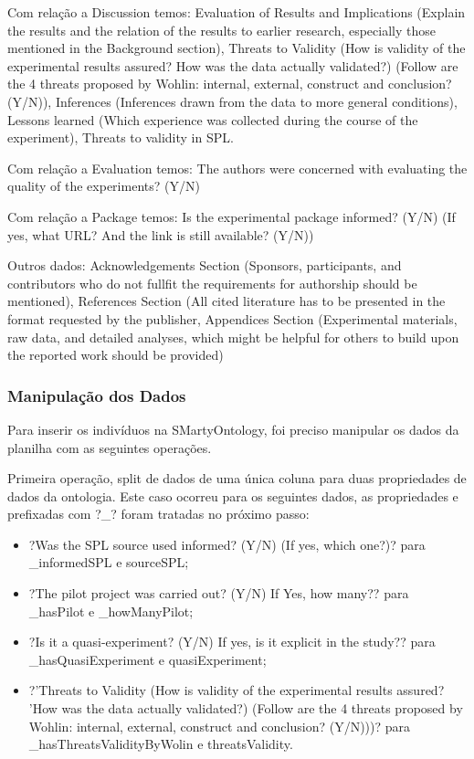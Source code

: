 Com relação a Discussion temos: Evaluation of Results and Implications (Explain the results and the relation of the results to earlier research, especially those mentioned in the Background section), Threats to Validity (How is validity of the experimental results assured? How was the data actually validated?) (Follow are the 4 threats proposed by Wohlin: internal, external, construct and conclusion? (Y/N)), Inferences (Inferences drawn from the data to more general conditions), Lessons learned (Which experience was collected during the course of the experiment), Threats to validity in SPL.

Com relação a Evaluation temos: The authors were concerned with evaluating the quality of the experiments? (Y/N)

Com relação a Package temos: Is the experimental package informed? (Y/N) (If yes, what URL? And the link is still available? (Y/N))

Outros dados: Acknowledgements Section (Sponsors, participants, and contributors who do not fullfit the requirements for authorship should be mentioned), References Section (All cited literature has to be presented in the format requested by the publisher, Appendices Section (Experimental materials, raw data, and detailed analyses, which might be helpful for others to build upon the reported work should be provided)

\subsubsection{Manipulação dos Dados}

Para inserir os indivíduos na SMartyOntology, foi preciso manipular os dados da planilha com as seguintes operações.

Primeira operação, split de dados de uma única coluna para duas propriedades de dados da ontologia. Este caso ocorreu para os seguintes dados, as propriedades e prefixadas com ?\_? foram tratadas no próximo passo:

\begin{itemize}
	\item ?Was the SPL source used informed? (Y/N) (If yes, which one?)? para \_informedSPL e sourceSPL;
	\item ?The pilot project was carried out? (Y/N) If Yes, how many?? para \_hasPilot e \_howManyPilot;
	\item ?Is it a quasi-experiment? (Y/N) If yes, is it explicit in the study?? para \_hasQuasiExperiment e quasiExperiment;
	\item ?'Threats to Validity (How is validity of the experimental results assured? 'How was the data actually validated?) (Follow are the 4 threats proposed by Wohlin: internal, external, construct and conclusion? (Y/N)))? para \_hasThreatsValidityByWolin e threatsValidity.
\end{itemize}

